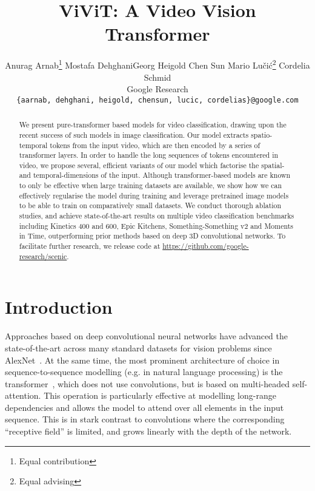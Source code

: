 \documentclass[10pt,twocolumn,letterpaper]{article}
\begin{document}
\title{\vspace{-\baselineskip} ViViT: A Video Vision Transformer}

\author{Anurag Arnab\thanks{Equal contribution} \quad Mostafa Dehghani\footnotemark[1] \quad Georg Heigold \quad Chen Sun \quad Mario Lučić\thanks{Equal advising}  \quad  Cordelia Schmid\footnotemark[2] \\
Google Research \\
{\tt\small \{aarnab, dehghani, heigold, chensun, lucic, cordelias\}@google.com}
}

\maketitle
\ificcvfinal\thispagestyle{empty}\fi

\begin{abstract}
	
We present pure-transformer based models for video classification, drawing upon the recent success of such models in image classification.
Our model extracts spatio-temporal tokens from the input video, which are then encoded by a series of transformer layers.
In order to handle the long sequences of tokens encountered in video, we propose several, efficient variants of our model which factorise the spatial- and temporal-dimensions of the input. Although transformer-based models are known to only be effective when large training datasets are available, we show how we can effectively regularise the model during training and leverage pretrained image models to be able to train on comparatively small datasets.
We conduct thorough ablation studies, and achieve state-of-the-art results on multiple video classification benchmarks including Kinetics 400 and 600, Epic Kitchens, Something-Something v2 and Moments in Time, outperforming prior methods based on deep 3D convolutional networks.
To facilitate further research, we release code at \href{https://github.com/google-research/scenic/tree/main/scenic/projects/vivit}{https://github.com/google-research/scenic}.



\end{abstract} 

\section{Introduction}


Approaches based on deep convolutional neural networks have advanced the state-of-the-art across many standard datasets for vision problems since AlexNet~\cite{krizhevsky_neurips_2012}.
At the same time, the most prominent architecture of choice in sequence-to-sequence modelling (e.g. in natural language processing) is the transformer~\cite{vaswani_neurips_2017}, which does not use convolutions, but is based on multi-headed self-attention.
This operation is particularly effective at modelling long-range dependencies and allows the model to attend over all elements in the input sequence.
This is in stark contrast to convolutions where the corresponding ``receptive field'' is limited, and grows linearly with the depth of the network.
\end{document}
